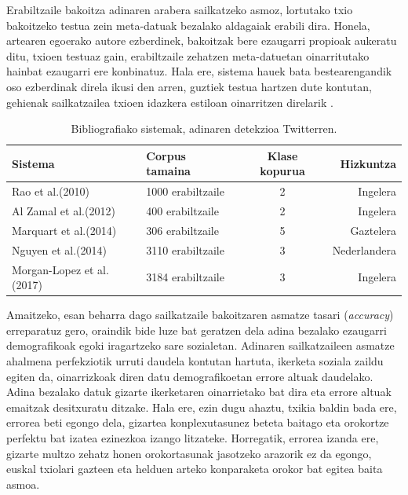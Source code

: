 \documentclass[information,article,submit,moreauthors,pdftex,10pt,a4paper]{Definitions/mdpi}
\begin{document}
Erabiltzaile bakoitza adinaren arabera sailkatzeko asmoz, lortutako txio bakoitzeko testua zein meta-datuak bezalako aldagaiak erabili dira. Honela, artearen egoerako autore ezberdinek, bakoitzak bere ezaugarri propioak aukeratu ditu, txioen testuaz gain, erabiltzaile zehatzen meta-datuetan oinarritutako hainbat ezaugarri ere konbinatuz. Hala ere, sistema hauek bata bestearengandik oso ezberdinak direla ikusi den arren, guztiek testua hartzen dute kontutan, gehienak sailkatzailea txioen idazkera estiloan oinarritzen direlarik \citep{rao2010classifying,al2012homophily,nguyen2013old,morgan2017predicting}.\\

\begin{table}[H]
  \centering
  \begin{tabular}{|l|l|c|r|}
    \hline
    \textbf{Sistema} & \textbf{Corpus tamaina} & \textbf{Klase kopurua} & \textbf{Hizkuntza}\\ \hline
    Rao et al.(2010) & 1000 erabiltzaile & 2 & Ingelera\\ \hline
    Al Zamal et al.(2012) & 400 erabiltzaile & 2 & Ingelera\\ \hline
    Marquart et al.(2014) & 306 erabiltzaile & 5 & Gaztelera\\ \hline
    Nguyen et al.(2014) & 3110 erabiltzaile & 3 & Nederlandera\\ \hline
    Morgan-Lopez et al.(2017) & 3184 erabiltzaile & 3 & Ingelera\\ \hline
  \end{tabular}
  \caption{Bibliografiako sistemak, adinaren detekzioa Twitterren.}
  \label{tab:arte ezaug}
\end{table}

Amaitzeko, esan beharra dago sailkatzaile bakoitzaren asmatze tasari (\textit{accuracy}) erreparatuz gero, oraindik bide luze bat geratzen dela adina bezalako ezaugarri demografikoak egoki iragartzeko sare sozialetan. Adinaren sailkatzaileen asmatze ahalmena perfekziotik urruti daudela kontutan hartuta, ikerketa soziala zaildu egiten da, oinarrizkoak diren datu demografikoetan errore altuak daudelako. Adina bezalako datuk gizarte ikerketaren oinarrietako bat dira eta errore altuak emaitzak desitxuratu ditzake. Hala ere, ezin dugu ahaztu, txikia baldin bada ere, errorea beti egongo dela, gizartea konplexutasunez beteta baitago eta orokortze perfektu bat izatea ezinezkoa izango litzateke. Horregatik, errorea izanda ere, gizarte multzo zehatz honen orokortasunak jasotzeko arazorik ez da egongo, euskal txiolari gazteen eta helduen arteko konparaketa orokor bat egitea baita asmoa.\\
\end{document}
